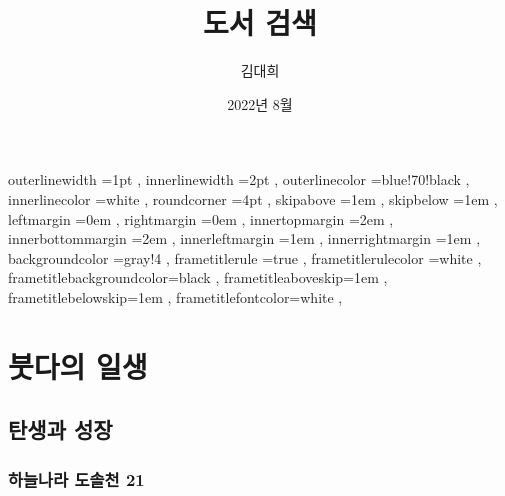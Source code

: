 \documentclass[12pt, a4paper, oneside]{book}
\let\stdsection\section
\renewcommand\section{\newpage\stdsection}
\begin{document}
	
			\dominitoc
			\doparttoc			



			\title{도서 검색}
			\author{김대희}
			\date{2022년 8월}
			\maketitle


			\tableofcontents 		%
			\listoffigures 			%
			\cleardoublepage
			\listoftables 			%





		 {
						outerlinewidth		=1pt			,%
						innerlinewidth		=2pt			,%
						outerlinecolor		=blue!70!black	,%
						innerlinecolor		=white 			,%
						roundcorner			=4pt			,%
						skipabove			=1em 			,%
						skipbelow			=1em 			,%
						leftmargin			=0em			,%
						rightmargin			=0em			,%
						innertopmargin		=2em 			,%
						innerbottommargin 	=2em 			,%
						innerleftmargin		=1em 			,%
						innerrightmargin		=1em 			,%
						backgroundcolor		=gray!4			,%
						frametitlerule		=true 			,%
						frametitlerulecolor	=white			,%
						frametitlebackgroundcolor=black		,%
						frametitleaboveskip=1em 			,%
						frametitlebelowskip=1em 			,%
						frametitlefontcolor=white 			,%
						}



	\part{붓다의 일생}
	\noptcrule
	\parttoc				

%
%
%
\chapter{탄생과 성장}


%
	\section{하늘나라 도솔천 21 }
\end{document}

